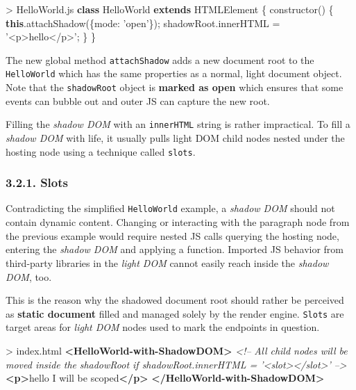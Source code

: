 \documentclass[]{article}
\newenvironment{Shaded}{}{}
\newcommand{\KeywordTok}[1]{\textcolor[rgb]{0.00,0.44,0.13}{\textbf{{#1}}}}
\newcommand{\DataTypeTok}[1]{\textcolor[rgb]{0.56,0.13,0.00}{{#1}}}
\newcommand{\StringTok}[1]{\textcolor[rgb]{0.25,0.44,0.63}{{#1}}}
\newcommand{\CommentTok}[1]{\textcolor[rgb]{0.38,0.63,0.69}{\textit{{#1}}}}
\newcommand{\VariableTok}[1]{\textcolor[rgb]{0.10,0.09,0.49}{{#1}}}
\newcommand{\OperatorTok}[1]{\textcolor[rgb]{0.40,0.40,0.40}{{#1}}}
\newcommand{\AttributeTok}[1]{\textcolor[rgb]{0.49,0.56,0.16}{{#1}}}
\newcommand{\NormalTok}[1]{{#1}}
\begin{document}
\begin{Shaded}
\begin{Highlighting}[]
\OperatorTok{>} \VariableTok{HelloWorld}\NormalTok{.}\AttributeTok{js}
\KeywordTok{class} \NormalTok{HelloWorld }\KeywordTok{extends} \NormalTok{HTMLElement }\OperatorTok{\{}
 \AttributeTok{constructor}\NormalTok{() }\OperatorTok{\{}
   \KeywordTok{this}\NormalTok{.}\AttributeTok{attachShadow}\NormalTok{(}\OperatorTok{\{}\DataTypeTok{mode}\OperatorTok{:} \StringTok{'open'}\OperatorTok{\}}\NormalTok{)}\OperatorTok{;}
   \VariableTok{shadowRoot}\NormalTok{.}\AttributeTok{innerHTML} \OperatorTok{=} \StringTok{'<p>hello</p>'}\OperatorTok{;}
 \OperatorTok{\}}
\OperatorTok{\}}
\end{Highlighting}
\end{Shaded}

The new global method \texttt{attachShadow} adds a new document root to
the \texttt{HelloWorld} which has the same properties as a normal, light
document object. Note that the \texttt{shadowRoot} object is
\textbf{marked as open} which ensures that some events can bubble out
and outer JS can capture the new root.

Filling the \emph{shadow DOM} with an \texttt{innerHTML} string is
rather impractical. To fill a \emph{shadow DOM} with life, it usually
pulls light DOM child nodes nested under the hosting node using a
technique called \texttt{slots}.

\subsubsection{3.2.1. Slots}\label{slots}

Contradicting the simplified \texttt{HelloWorld} example, a \emph{shadow
DOM} should not contain dynamic content. Changing or interacting with
the paragraph node from the previous example would require nested JS
calls querying the hosting node, entering the \emph{shadow DOM} and
applying a function. Imported JS behavior from third-party libraries in
the \emph{light DOM} cannot easily reach inside the \emph{shadow DOM},
too.

This is the reason why the shadowed document root should rather be
perceived as \textbf{static document} filled and managed solely by the
render engine. \texttt{Slots} are target areas for \emph{light DOM}
nodes used to mark the endpoints in question.

\begin{Shaded}
\begin{Highlighting}[]
\NormalTok{> index.html}
\KeywordTok{<HelloWorld-with-ShadowDOM>}
  \CommentTok{<!--}
\CommentTok{    All child nodes will be moved inside the}
\CommentTok{    shadowRoot if shadowRoot.innerHTML = '<slot></slot>'}
\CommentTok{    -->}
  \KeywordTok{<p>}\NormalTok{hello I will be scoped}\KeywordTok{</p>}
\KeywordTok{</HelloWorld-with-ShadowDOM>}
\end{Highlighting}
\end{Shaded}
\end{document}
